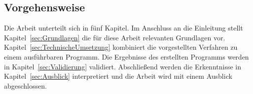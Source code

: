 \subsection{Vorgehensweise}
Die Arbeit unterteilt sich in fünf Kapitel.
Im Anschluss an die Einleitung stellt Kapitel~\ref{sec:Grundlagen} die für diese Arbeit relevanten Grundlagen vor.
Kapitel~\ref{sec:TechnischeUmsetzung} kombiniert die vorgestellten Verfahren zu einem ausführbaren Programm.
Die Ergebnisse des erstellten Programms werden in Kapitel~\ref{sec:Validierung} validiert.
Abschließend werden die Erkenntnisse in Kapitel~\ref{sec:Ausblick} interpretiert und die Arbeit wird mit einem Ausblick abgeschlossen.